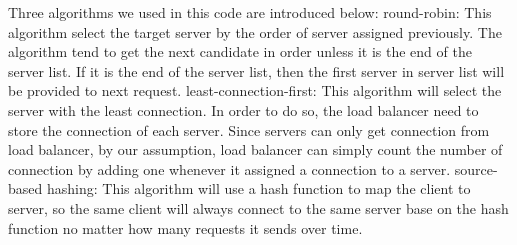 Three algorithms we used in this code are introduced below:
\ci round-robin: This algorithm select the target server by the order of server
assigned previously.  The algorithm tend to get the next candidate in order
unless it is the end of the server list.  If it is the end of the server list,
then the first server in server list will be provided to next request.
\cii least-connection-first: This algorithm will select the server with the
least connection.  In order to do so, the load balancer need to store the
connection of each server.  Since servers can only get connection from load
balancer, by our assumption, load balancer can simply count the number of
connection by adding one whenever it assigned a connection to a server.
\ciii source-based hashing: This algorithm will use a hash function to map the
client to server, so the same client will always connect to the same server base
on the hash function no matter how many requests it sends over time.


